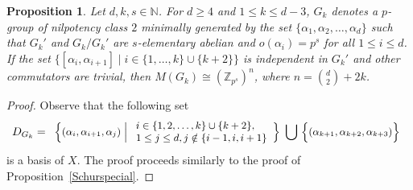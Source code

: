 \documentclass[preprint,sort&compress,12pt]{elsarticle}
\newtheorem{proposition}[theorem]{Proposition}
\numberwithin{equation}{section}
\theoremstyle{definition}
\newcommand{\Z}{\mathbb{Z}}
\begin{document}
\begin{proposition}
Let $d,k,s \in \mathbb N$. For  $d \ge 4$ and $1 \le k \le d-3$,  $G_k$ denotes a $p$-group of nilpotency class $2$  minimally generated by the set 
$\{\alpha_1,\alpha_2,\ldots,\alpha_d\}$ such that $G_k'$ and $G_k/G_k'$ are $s$-elementary abelian and $o(\alpha_i)=p^s$ for all $1 \le i \le d$.  If the set 
   ${\{[\alpha_i,\alpha_{i+1}] \mid i \in \{1,\ldots,  k\}\cup\{k+2\}\}}$ is independent in $G_k'$ and other commutators are trivial, then  $M(G_k)\cong (\Z_{p^s})^n$, where ${n=\binom{d}{2}+2k}$.
 \end{proposition} 
 \begin{proof}
Observe that the following set 
\begin{equation*}
\small
D_{G_k}=\begin{array}{cl}
\Bigl\{
(\alpha_i,\alpha_{i+1},\alpha_j)
\;\Big|\;
\begin{array}{l}
i\in \{1,2,\ldots,k\}\cup\{k+2\},\\
 1\leq j \leq d,  j \notin \{ i-1,i,i+1\}\end{array}
\Bigr\}
\displaystyle
 \ \bigcup \ 
\Bigl\{
(\alpha_{k+1},\alpha_{k+2},\alpha_{k+3})
\Bigr\}
\end{array}
\end{equation*}
is a basis of $X$. The proof proceeds similarly to the proof of Proposition~\ref{Schurspecial}.
\end{proof}
\end{document}
